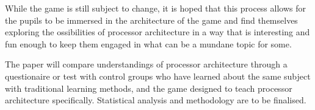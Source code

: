 \documentclass[a4paper]{article}
\begin{document}
While the game is still subject to change, it is hoped that this process allows for the pupils to be immersed in the architecture of the game and find themselves exploring the ossibilities of processor architecture in a way that is interesting and fun enough to keep them engaged in what can be a mundane topic for some. 

The paper will compare understandings of processor architecture through a questionaire or test with control groups who have learned about the same subject with traditional learning methods, and the game designed to teach processor architecture specifically. Statistical analysis and methodology are to be finalised. 
\end{document}

